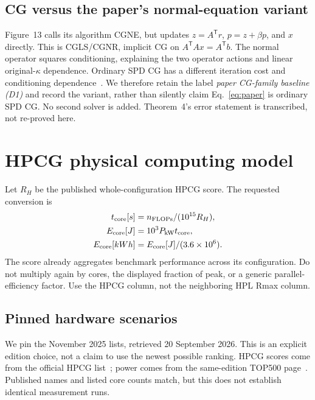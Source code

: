 \documentclass[11pt,a4paper]{article}
\begin{document}
\subsection{CG versus the paper's normal-equation variant}
Figure~13 calls its algorithm CGNE, but updates $z=A^{\mathsf T}r$, $p=z+\beta p$, and $x$ directly. This is CGLS/CGNR, implicit CG on $A^{\mathsf T}Ax=A^{\mathsf T}b$. The normal operator squares conditioning, explaining the two operator actions and linear original-$\kappa$ dependence. Ordinary SPD CG has a different iteration cost and conditioning dependence~\cite{templates}. We therefore retain the label \emph{paper CG-family baseline (D1)} and record the variant, rather than silently claim Eq.~\eqref{eq:paper} is ordinary SPD CG. No second solver is added. Theorem~4's error statement is transcribed, not re-proved here.

\section{HPCG physical computing model}
Let $R_H$ be the published whole-configuration HPCG score. The requested conversion is
\begin{align}
 t_{\rm core}[s]&=n_{\rm FLOPs}/(10^{15}R_H),\\
 E_{\rm core}[J]&=10^3P_{\rm kW}t_{\rm core},\\
 E_{\rm core}[kWh]&=E_{\rm core}[J]/(3.6\times10^6).
\end{align}
The score already aggregates benchmark performance across its configuration. Do not multiply again by cores, the displayed fraction of peak, or a generic parallel-efficiency factor. Use the HPCG column, not the neighboring HPL Rmax column.

\subsection{Pinned hardware scenarios}
We pin the November 2025 lists, retrieved 20 September 2026. This is an explicit edition choice, not a claim to use the newest possible ranking. HPCG scores come from the official HPCG list~\cite{hpcglist}; power comes from the same-edition TOP500 page~\cite{top500}. Published names and listed core counts match, but this does not establish identical measurement runs.

\begin{table}[htbp]\centering\small

\caption{Published rate and power inputs, followed by derived time and energy for $10^{18}$ modeled FLOPs. This unit-work example has no implied matrix size or capacity certification. Power is a proxy, not verified contemporaneous HPCG power.}
\end{table}
\end{document}
